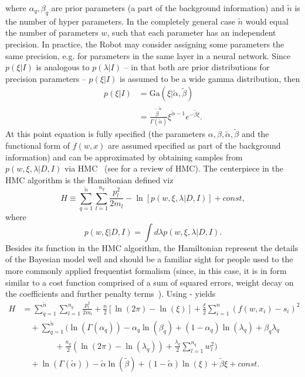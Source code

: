 where $\alpha_q,\beta_q$ are prior parameters (a part of the background information) and $\tilde{n}$ is the number of hyper parameters. In the completely general case $\tilde{n}$ would equal the number of parameters $w$, such that each parameter has an independent precision. In practice, the Robot may consider assigning some parameters the same precision, e.g. for parameters in the same layer in a neural network. Since $p(\xi|I)$ is analogous to $p(\lambda|I)$ -- in that both are prior distributions for precision parameters -- $p(\xi|I)$ is assumed to be a wide gamma distribution, then
\begin{equation}
	\begin{split}
		p(\xi|I) & = \text{Ga}(\xi|\tilde{\alpha},\tilde{\beta})\\
		& =\frac{\tilde{\beta}^{\tilde{\alpha}}}{\Gamma(\tilde{\alpha})}\xi^{\tilde{\alpha}-1}e^{-\tilde{\beta} \xi}.
	\end{split}
	\label{p7}
\end{equation}
At this point equation  is fully specified (the parameters $\alpha,\beta,\tilde{\alpha},\tilde{\beta}$ and the functional form of $f(w,x)$ are assumed specified as part of the background information) and can be approximated by obtaining samples from $p(w,\xi,\lambda|D,I)$ via HMC~\citep{Hammersley1964,Duane:1987de,Neal:1996,Neal2012} (see  for a review of HMC). The centerpiece in the HMC algorithm is the Hamiltonian defined viz~\citep{Neal:1996,Neal2012}
\begin{equation}
	H \equiv  \sum_{q=1}^{\tilde{n}}\sum_{l=1}^{n_q}\frac{p_{l}^2}{2m_{l}}-\ln[p(w,\xi,\lambda|D,I)]+const,
	\label{eqh}
\end{equation}
where 
\begin{equation}
	p(w,\xi|D,I) = \int d\lambda p(w,\xi,\lambda|D,I).
	\label{eq:ss}
\end{equation}
Besides its function in the HMC algorithm, the Hamiltonian represent the details of the Bayesian model well and should be a familiar sight for people used to the more commonly applied frequentist formalism (since, in this case, it is in form similar to a cost function comprised of a sum of squared errors, weight decay on the coefficients and further penalty terms~\citep{hastie_09,murphy2013machine,Goodfellow2016}). Using - yields
\begin{equation}
	\begin{split}
		H&=\sum_{q=1}^{\tilde{n}}\sum_{l=1}^{n_q}\frac{p_{l}^2}{2m_{l}}+\frac{n}{2}[\ln(2\pi)-\ln(\xi)] +\frac{\xi}{2}\sum_{i=1}^{n}(f(w,x_i)-s_i)^2\\
		&\quad+\sum_{q=1}^{\tilde{n}}\bigg(\ln(\Gamma(\alpha_q))-\alpha_q\ln(\beta_q)+(1-\alpha_q)\ln(\lambda_q)+\beta_q\lambda_q\\
		&\qquad\qquad+\frac{n_q}{2}(\ln(2\pi)-\ln(\lambda_q))+\frac{\lambda_q}{2}\sum_{l=1}^{n_q}w_l^2\bigg)\\
		&\quad+\ln(\Gamma(\tilde{\alpha}))-\tilde{\alpha}\ln(\tilde{\beta})+(1-\tilde{\alpha})\ln(\xi)+\tilde{\beta}\xi+const.
	\end{split}
	\label{eqh2}
\end{equation}


